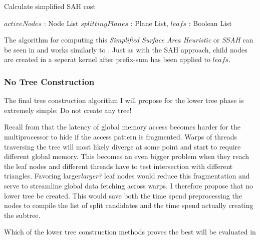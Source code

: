 \begin{algorithm}
  \caption{Calculate simplified SAH cost}
  \label{alg:calcBalancedCost}
  \begin{algorithmic}
              {$activeNodes$ : Node List}
              {$splittingPlanes$ : Plane List, $leafs$ : Boolean List}{
                  \ENDFOR
                \ENDFOR
              }
  \end{algorithmic}
\end{algorithm}


The algorithm for computing this \textit{Simplified Surface Area Heuristic} or
\textit{SSAH} can be seen in  and works similarly
to . Just as with the SAH approach, child nodes are
created in a seperat kernel after prefix-sum has been applied to $leafs$.

\subsubsection{No Tree Construction}

The final tree construction algorithm I will propose for the lower tree phase is
extremely simple: Do not create any tree!

Recall from  that the latency of global memory
access becomes harder for the multiprocessor to hide if the access pattern is
fragmented. Warps of threads traversing the tree will most likely diverge at
some point and start to require different global memory. This becomes an even
bigger problem when they reach the leaf nodes and different threads have to test
intersection with different triangles. Favoring larger\textit{larger?} leaf
nodes would reduce this fragmentation and serve to streamline global data
fetching across warps. I therefore propose that no lower tree be created. This
would save both the time spend preprocessing the nodes to compile the list of
split candidates and the time spend actually creating the subtree. 

Which of the lower tree construction methods proves the best will be evaluated
in 



